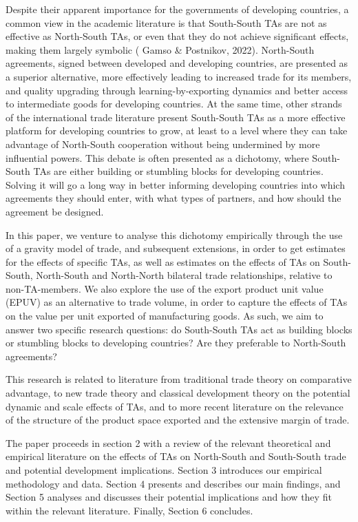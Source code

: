 Despite their apparent importance for the governments of developing
countries, a common view in the academic literature is that South-South
TAs are not as effective as North-South TAs, or even that they do not
achieve significant effects, making them largely symbolic (\cite{gamso_leveling-up_2022} Gamso \&
Postnikov, 2022). North-South agreements, signed between developed and
developing countries, are presented as a superior alternative, more
effectively leading to increased trade for its members, and quality
upgrading through learning-by-exporting dynamics and better access to
intermediate goods for developing countries. At the same time, other
strands of the international trade literature present South-South TAs as
a more effective platform for developing countries to grow, at least to
a level where they can take advantage of North-South cooperation without
being undermined by more influential powers. This debate is often
presented as a dichotomy, where South-South TAs are either building or
stumbling blocks for developing countries. Solving it will go a long
way in better informing developing countries into which agreements they
should enter, with what types of partners, and how should the agreement
be designed.

In this paper, we venture to analyse this dichotomy empirically through
the use of a gravity model of trade, and subsequent extensions, in order
to get estimates for the effects of specific TAs, as well as estimates
on the effects of TAs on South-South, North-South and North-North
bilateral trade relationships, relative to non-TA-members. We also
explore the use of the export product unit value (EPUV) as an
alternative to trade volume, in order to capture the effects of TAs on
the value per unit exported of manufacturing goods. As such, we aim to answer
two specific research questions: do South-South TAs act as building
blocks or stumbling blocks to developing countries? Are they preferable
to North-South agreements?

This research is related to literature from traditional trade theory on
comparative advantage, to new trade theory and classical development
theory on the potential dynamic and scale effects of TAs, and to more
recent literature on the relevance of the structure of the product space
exported and the extensive margin of trade.

The paper proceeds in section 2 with a review of the relevant
theoretical and empirical literature on the effects of TAs on
North-South and South-South trade and potential development
implications. Section 3 introduces our empirical methodology and data.
Section 4 presents and describes our main findings, and Section 5
analyses and discusses their potential implications and how they fit
within the relevant literature. Finally, Section 6 concludes.